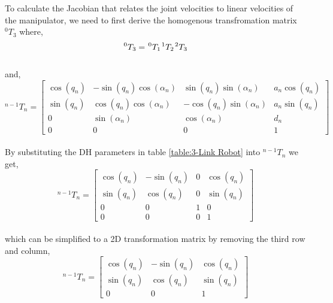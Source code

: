 To calculate the Jacobian that relates the joint velocities to linear velocities of the manipulator, we need to first derive the homogenous transfromation matrix $^{0}T_{3}$ where,
\begin{equation*}
    ^{0}T_{3}    = \hspace{1pt} ^{0}T_{1} \hspace{1pt} ^{1}T_{2}\hspace{1pt} ^{2}T_{3}\hspace{1pt}\\
\end{equation*}
\\and,
\begin{equation*}
    ^{n-1}T_{n}  = \begin{bmatrix}
        \cos(q_n) & -\sin(q_n)\cos(\alpha_n) & \sin(q_n)\sin(\alpha_n)  & a_n \cos(q_n) \\
        \sin(q_n) & \cos(q_n)\cos(\alpha_n)  & -\cos(q_n)\sin(\alpha_n) & a_n \sin(q_n) \\
        0         & \sin(\alpha_n)           & \cos(\alpha_n)           & d_n           \\
        0         & 0                        & 0                        & 1
    \end{bmatrix}
\end{equation*}
\\By substituting the DH parameters in table \ref{table:3-Link Robot} into $^{n-1}T_{n}$ we get,
\begin{equation*}
    ^{n-1}T_{n}  = \begin{bmatrix}
        \cos(q_n) & -\sin(q_n) & 0 & \cos(q_n) \\
        \sin(q_n) & \cos(q_n)  & 0 & \sin(q_n) \\
        0         & 0          & 1 & 0         \\
        0         & 0          & 0 & 1
    \end{bmatrix}
\end{equation*}
\\which can be simplified to a 2D transformation matrix by removing the third row and column,
\begin{equation*}
    ^{n-1}T_{n}  = \begin{bmatrix}
        \cos(q_n) & -\sin(q_n) & \cos(q_n) \\
        \sin(q_n) & \cos(q_n)  & \sin(q_n) \\
        0         & 0          & 1
    \end{bmatrix}
\end{equation*}
